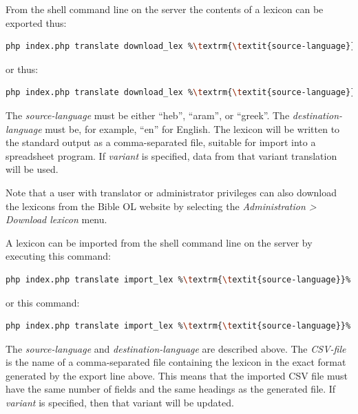 \documentclass[11pt,oneside,a4paper]{memoir}
\begin{document}
From the shell command line on the server the contents of a lexicon can be exported thus:

\begin{lstlisting}[language=bash,basicstyle={\ttfamily}]
php index.php translate download_lex %\textrm{\textit{source-language}}% %\textrm{\textit{target-language}}%
\end{lstlisting}

\noindent
or thus:

\begin{lstlisting}[language=bash,basicstyle={\ttfamily}]
php index.php translate download_lex %\textrm{\textit{source-language}}% %\textrm{\textit{target-language}}% %\textrm{\textit{variant}}%
\end{lstlisting}

The \emph{source-language} must be either ``heb'', ``aram'', or ``greek''. The
\emph{destination-language} must be, for example, ``en'' for English. The lexicon will be written to
the standard output as a comma-separated file, suitable for import into a spreadsheet program. If \emph{variant} is
specified, data from that variant translation will be used.

Note that a user with translator or administrator privileges can also download the lexicons from the
Bible OL website by selecting the \emph{Administration > Download lexicon} menu.

A lexicon can be imported from the shell command line on the server by executing this command:

\begin{lstlisting}[language=bash,basicstyle={\ttfamily}]
php index.php translate import_lex %\textrm{\textit{source-language}}% %\textrm{\textit{target-language}}% %\textrm{\textit{CSV-file}}%
\end{lstlisting}

\noindent
or this command:

\begin{lstlisting}[language=bash,basicstyle={\ttfamily}]
php index.php translate import_lex %\textrm{\textit{source-language}}% %\textrm{\textit{target-language}}% %\textrm{\textit{CSV-file}}% %\textrm{\textit{variant}}%
\end{lstlisting}


The \emph{source-language} and \emph{destination-language} are described above. The \emph{CSV-file}
is the name of a comma-separated file containing the lexicon in the exact format generated by the export line
above. This means that the imported CSV file must have the same number of fields and the same
headings as the generated file.  If \emph{variant} is
specified, then that variant will be updated.
\end{document}
